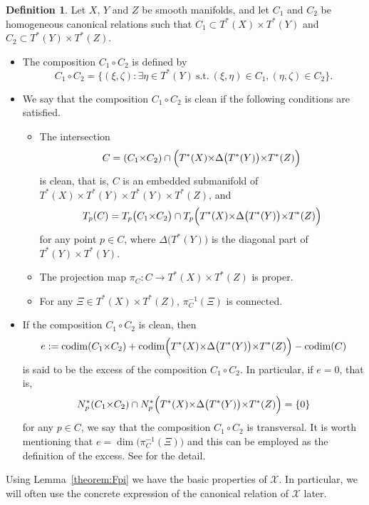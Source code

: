 \documentclass[a4paper,11pt,reqno]{amsart}
\numberwithin{equation}{section}
\theoremstyle{definition}
\newtheorem{definition}[theorem]{Definition}
\theoremstyle{remark}
\begin{document}
\begin{definition}
\label{theorem:clean} 
Let $X$, $Y$ and $Z$ be smooth manifolds, 
and let $C_1$ and $C_2$ be homogeneous canonical relations such that 
$C_1 \subset T^\ast(X){\times}T^\ast(Y)$ and 
$C_2 \subset T^\ast(Y){\times}T^\ast(Z)$. 
%
%
\begin{itemize}
\item 
The composition $C_1{\circ}C_2$ is defined by 
%
%
$$
C_1{\circ}C_2
=
\{
(\xi,\zeta) 
: 
\exists \eta \in T^\ast(Y)\ \text{s.t.}\ 
(\xi,\eta) \in C_1, (\eta,\zeta) \in C_2
\}.
$$
%
%
\item 
We say that the composition $C_1{\circ}C_2$ is clean if the following conditions are satisfied. 
%
%
\begin{itemize}
\item[(i)] 
The intersection 
%
%
$$
C
=
(C_1{\times}C_2)
\cap
\Bigl(
T^\ast(X){\times}\Delta\bigl(T^\ast(Y)\bigr){\times}T^\ast(Z)
\Bigr)
$$
%
%
is clean, that is, $C$ is an embedded submanifold of 
$T^\ast(X){\times}T^\ast(Y){\times}T^\ast(Y){\times}T^\ast(Z)$, 
and 
%
%
$$
T_p(C)
=
T_p\bigl(C_1{\times}C_2\bigr)
\cap
T_p\Bigl(T^\ast(X){\times}\Delta\bigl(T^\ast(Y)\bigr){\times}T^\ast(Z)\Bigr)
$$
%
%
for any point $p \in C$, 
where $\Delta\bigl(T^\ast(Y)\bigr)$ is the diagonal part of $T^\ast(Y){\times}T^\ast(Y)$. 
%
%
\item[(ii)]
The projection map $\pi_C: C \rightarrow T^\ast(X){\times}T^\ast(Z)$ is proper. 
\item[(iii)] 
For any $\Xi \in T^\ast(X){\times}T^\ast(Z)$, $\pi_C^{-1}(\Xi)$ is connected. 
\end{itemize}
%
%
\item 
If the composition $C_1{\circ}C_2$ is clean, then 
%
%
$$
e
:=
\operatorname{codim}(C_1{\times}C_2)
+
\operatorname{codim}\Bigl(T^\ast(X){\times}\Delta\bigl(T^\ast(Y)\bigr){\times}T^\ast(Z)\Bigr)
-
\operatorname{codim}(C)
$$
%
%
is said to be the excess of the composition $C_1{\circ}C_2$. 
In particular, if $e=0$, that is, 
%
%
$$
N_p^\ast(C_1{\times}C_2)
\cap
N_p^\ast\Bigl(T^\ast(X){\times}\Delta\bigl(T^\ast(Y)\bigr){\times}T^\ast(Z)\Bigr)
=
\{0\}
$$
%
%
for any $p \in C$, we say that the composition $C_1{\circ}C_2$ is transversal. 
It is worth mentioning that $e=\dim\bigl(\pi_C^{-1}(\Xi)\bigr)$ and this can be employed as the definition of the excess. See \cite[Section~21.2 and Appendix~C.3]{Hoermander3} for the detail. 
\end{itemize}
%
%
\end{definition}
%
%
%
Using Lemma~\ref{theorem:Fpi} we have the basic properties of $\mathcal{X}$. In particular, we will often use the concrete expression of the canonical relation of $\mathcal{X}$ later.
\end{document}
